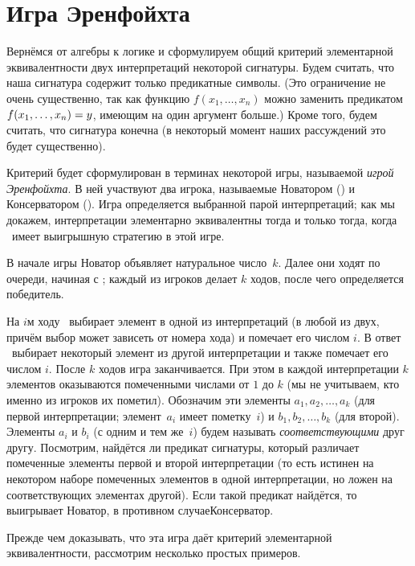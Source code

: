 \section{Игра Эренфойхта}
        \label{ehrenfeucht-game}%
Вернёмся от алгебры к логике и сформулируем общий критерий
элементарной эквивалентности двух интерпретаций некоторой
сигнатуры. Будем считать, что наша сигнатура содержит только
предикатные символы. (Это ограничение не очень существенно, так
как функцию $f(x_1,\dots,x_n)$ можно заменить предикатом
$f(x_1,\dots,x_n)\hm=y$, имеющим на один аргумент больше.) Кроме
того, будем считать, что сигнатура конечна (в некоторый момент
наших рассуждений это будет существенно).

Критерий будет сформулирован в терминах некоторой игры,
называемой \emph{игрой Эренфойхта}.%
%
В ней участвуют два игрока,
называемые Новатором (\Н) и Консерватором (\К). Игра определяется
выбранной парой интерпретаций; как мы докажем, интерпретации
элементарно эквивалентны тогда и только тогда, когда \К\ имеет
выигрышную стратегию в этой игре.

В начале игры Новатор объявляет натуральное число~$k$. Далее они
ходят по очереди, начиная с \Н; каждый из игроков делает $k$
ходов, после чего определяется победитель.

На $i$\д м ходу \Н\ выбирает элемент в одной из интерпретаций (в
любой из двух, причём выбор может зависеть от номера хода) и
помечает его числом $i$. В ответ \К\ выбирает некоторый элемент
из другой интерпретации и также помечает его числом $i$. После
$k$ ходов игра заканчивается. При этом в каждой интерпретации
$k$ элементов оказываются помеченными числами от $1$ до $k$ (мы
не учитываем, кто именно из игроков их пометил). Обозначим эти
элементы $a_1,a_2,\ldots,a_k$ (для первой интерпретации;
элемент~$a_i$ имеет пометку~$i$) и $b_1,b_2,\ldots,b_k$ (для
второй). Элементы $a_i$ и $b_i$ (с одним и тем же~$i$) будем
называть \emph{соответствующими} друг другу. Посмотрим, найдётся
ли предикат сигнатуры, который различает помеченные элементы
первой и второй интерпретации (то есть истинен на некотором
наборе помеченных элементов в одной интерпретации, но ложен на
соответствующих элементах другой). Если такой предикат найдётся,
то выигрывает Новатор, в противном случае\т Консерватор.

Прежде чем доказывать, что эта игра даёт критерий
элементарной эквивалентности, рассмотрим несколько простых
примеров.

